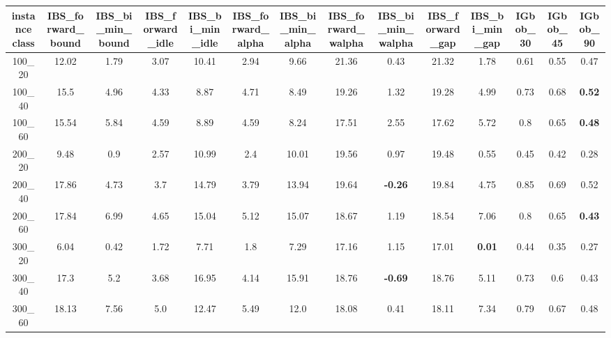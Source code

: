 \begin{tabular}{c|ccccccccccccc}
instance class & IBS\_forward\_bound & IBS\_bi\_min\_bound & IBS\_forward\_idle & IBS\_bi\_min\_idle & IBS\_forward\_alpha & IBS\_bi\_min\_alpha & IBS\_forward\_walpha & IBS\_bi\_min\_walpha & IBS\_forward\_gap & IBS\_bi\_min\_gap & IGbob\_30 & IGbob\_45 & IGbob\_90 \\ 
\hline
100\_20      & 12.02        & 1.79         & 3.07         & 10.41        & 2.94         & 9.66         & 21.36        & 0.43         & 21.32        & 1.78         & 0.61         & 0.55         & 0.47         \\ 
100\_40      & 15.5         & 4.96         & 4.33         & 8.87         & 4.71         & 8.49         & 19.26        & 1.32         & 19.28        & 4.99         & 0.73         & 0.68         & {\bf 0.52}   \\ 
100\_60      & 15.54        & 5.84         & 4.59         & 8.89         & 4.59         & 8.24         & 17.51        & 2.55         & 17.62        & 5.72         & 0.8          & 0.65         & {\bf 0.48}   \\ 
200\_20      & 9.48         & 0.9          & 2.57         & 10.99        & 2.4          & 10.01        & 19.56        & 0.97         & 19.48        & 0.55         & 0.45         & 0.42         & 0.28         \\ 
200\_40      & 17.86        & 4.73         & 3.7          & 14.79        & 3.79         & 13.94        & 19.64        & {\bf -0.26}  & 19.84        & 4.75         & 0.85         & 0.69         & 0.52         \\ 
200\_60      & 17.84        & 6.99         & 4.65         & 15.04        & 5.12         & 15.07        & 18.67        & 1.19         & 18.54        & 7.06         & 0.8          & 0.65         & {\bf 0.43}   \\ 
300\_20      & 6.04         & 0.42         & 1.72         & 7.71         & 1.8          & 7.29         & 17.16        & 1.15         & 17.01        & {\bf 0.01}   & 0.44         & 0.35         & 0.27         \\ 
300\_40      & 17.3         & 5.2          & 3.68         & 16.95        & 4.14         & 15.91        & 18.76        & {\bf -0.69}  & 18.76        & 5.11         & 0.73         & 0.6          & 0.43         \\ 
300\_60      & 18.13        & 7.56         & 5.0          & 12.47        & 5.49         & 12.0         & 18.08        & 0.41         & 18.11        & 7.34         & 0.79         & 0.67         & 0.48         \\ 

\end{tabular}
